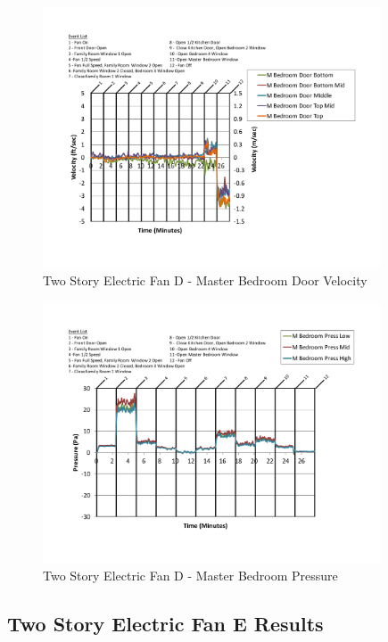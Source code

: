 \documentclass{article}
\begin{document}
\begin{appendices}
	\begin{figure}[H]
		\centering
		\includegraphics[height=3.05in,trim=0.67in 1.1in 0.67in 0.8in,clip=true]{0_Images/Results_Charts/ColdFlow/Two_Story/Electric/D/Master_Bedroom_Door_Velocity.pdf}
		\caption{Two Story Electric Fan D - Master Bedroom Door Velocity}
	\end{figure}
 

	\begin{figure}[H]
		\centering
		\includegraphics[height=3.05in,trim=0.67in 1.1in 0.67in 0.8in,clip=true]{0_Images/Results_Charts/ColdFlow/Two_Story/Electric/D/Master_Bedroom_Pressure.pdf}
		\caption{Two Story Electric Fan D - Master Bedroom Pressure}
	\end{figure}
 
	\clearpage

		\clearpage
\clearpage		\large
\subsection{Two Story Electric Fan E Results} \label{App:Two_StoryElectricFanEResults} 


\end{appendices}
\end{document}
